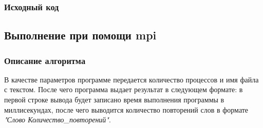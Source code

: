 \documentclass[12pt,a4paper]{report}
\begin{document}
				\subsubsection{Исходный код}
					
			\subsection{Выполнение при помощи mpi}
				\subsubsection{Описание алгоритма}
					В качестве параметров программе передается количество процессов и имя файла с текстом. После чего программа выдает результат в следующем формате: в первой строке вывода будет записано время выполнения программы в миллисекундах, после чего выводится количество повторений слов в формате \textit{"Слово Количество\_повторений"}.
					
\end{document}

